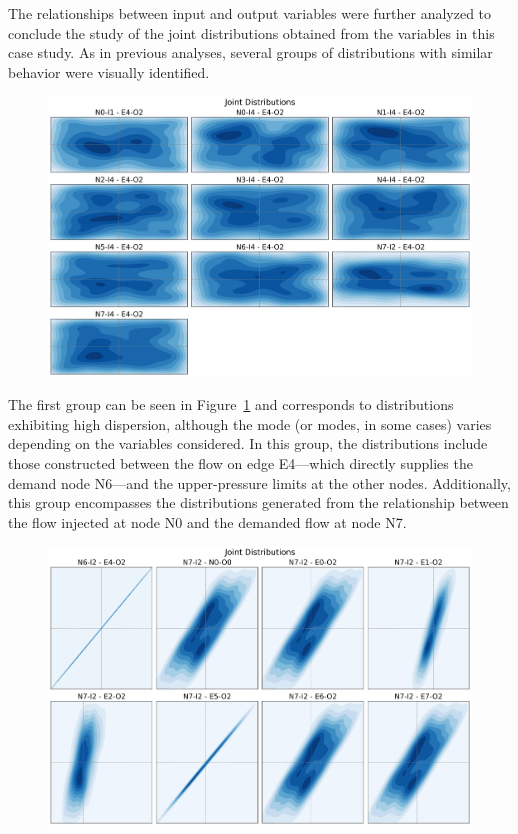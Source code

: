 The relationships between input and output variables were further analyzed to conclude the study of the joint distributions obtained from the variables in this case study. As in previous analyses, several groups of distributions with similar behavior were visually identified. \begin{figure}
    \begin{center}
        \includegraphics[width=.7\textwidth]{figures/Chapter_NonLinealCensnet/inputs_outputs_1.png}
    \end{center}
    \caption{}\label{fig:joint_distributions_inputs_outputs_1}
\end{figure}

The first group can be seen in Figure~\cref{fig:joint_distributions_inputs_outputs_1} and corresponds to distributions exhibiting high dispersion, although the mode (or modes, in some cases) varies depending on the variables considered. In this group, the distributions include those constructed between the flow on edge E4—which directly supplies the demand node N6—and the upper-pressure limits at the other nodes. Additionally, this group encompasses the distributions generated from the relationship between the flow injected at node N0 and the demanded flow at node N7.




\begin{figure}
    \begin{center}
        \includegraphics[width=.7\textwidth]{figures/Chapter_NonLinealCensnet/inputs_outputs_2.png}
    \end{center}
    \caption{}\label{fig:joint_distributions_inputs_outputs_2}
\end{figure}
 

